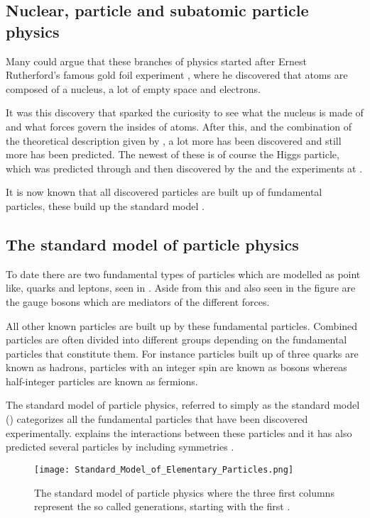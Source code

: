 \subsection{Nuclear, particle and subatomic particle physics}\label{sec:tb:subsec:nps}
Many could argue that these branches of physics started after Ernest Rutherford's famous gold foil experiment \citep{Burchan:1995}, where he discovered that atoms are composed of a nucleus, a lot of empty space and electrons. 

It was this discovery that sparked the curiosity to see what the nucleus is made of and what forces govern the insides of atoms. After this, and the combination of the theoretical description given by \abbrQM, a lot more has been discovered and still more has been predicted. The newest of these is of course the Higgs particle, which was predicted through \abbrQFT and then discovered by the \abbrATLAS and the \abbrCMS experiments at \abbrCERN \citep{Higgs:2012, Chatrchyan:2012}. 

It is now known that all discovered particles are built up of fundamental particles, these build up the standard model \citep{Burchan:1995}.
\subsection{The standard model of particle physics}\label{sec:tb:subsec:SM}
To date there are two fundamental types of particles which are modelled as point like, quarks and leptons, seen in . Aside from this and also seen in the figure are the gauge bosons which are mediators of the different forces.

All other known particles are built up by these fundamental particles. Combined particles are often divided into different groups depending on the fundamental particles that constitute them. For instance particles built up of three quarks are known as hadrons, particles with an integer spin are known as bosons whereas half-integer particles are known as fermions.

The standard model of particle physics, referred to simply as the standard model (\abbrSM) categorizes all the fundamental particles that have been discovered experimentally. \abbrQFT explains the interactions between these particles and it has also predicted several particles by including symmetries \citep{Burchan:1995}.
\begin{figure}[h]
 \centering
\texttt{[image: Standard\_Model\_of\_Elementary\_Particles.png]}
  \caption{{\small The standard model of particle physics where the three first columns represent the so called generations, starting with the first \citep{wiki1}.}}
    \label{fig:SM}
\end{figure}


